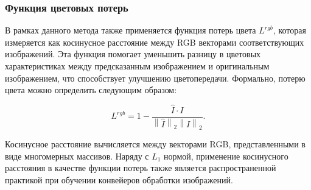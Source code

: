 \subsubsection{Функция цветовых потерь}

В рамках данного метода также применяется функция потерь цвета $L^{rgb}$, которая измеряется как косинусное расстояние между RGB векторами соответствующих изображений. Эта функция помогает уменьшить разницу в цветовых характеристиках между предсказанным изображением и оригинальным изображением, что способствует улучшению цветопередачи. Формально, потерю цвета можно определить следующим образом:

\begin{equation}
    \label{eq:2-1-3-4}
    L^{rgb} = 1 - \frac{\hat{I} \cdot I}{\left\|\hat{I}\right\|_2 \left\|I\right\|_2}.
\end{equation}

Косинусное расстояние вычисляется между векторами RGB, представленными в виде многомерных массивов. Наряду с $L_1$ нормой, применение косинусного расстояния в качестве функции потерь также является распространенной практикой при обучении конвейеров обработки изображений.
